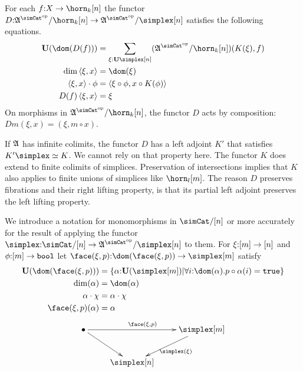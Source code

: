 \documentclass[csh.tex]{subfiles}
\begin{document}
\begin{definition}
For each $f\of X\to\horn_k[n]$ the functor $D\of \ambient\s/\horn_k[n]\to\ambient\s/\simplex[n]$ satisfies the following equations.
\begin{align*}
\base(\dom(D(f))) &= \sum_{\xi\of\base\simplex[n]}(\ambient\s/\horn_k[n])(K(\xi),f)\\
\dim\tuplet{\xi,x} &= \dom(\xi)\\
\tuplet{\xi,x}\cdot\phi &= \tuplet{\xi\circ\phi,x\circ K(\phi)}\\
D(f)\tuplet{\xi,x} &= \xi
\end{align*}
On morphisms in $\ambient\s/\horn_k[n]$, the functor $D$ acts by composition: $Dm(\xi,x) = (\xi,m\circ x)$. \label{descent functor}
\end{definition}

If $\mathfrak A$ has infinite colimits, the functor $D$ has a left adjoint $K'$ that satisfies $K'\simplex\simeq K$. We cannot rely on that property here. The functor $K$ does extend to finite colimits of simplices. Preservation of intersections implies that $K$ also applies to finite unions of simplices like $\horn_l[m]$. The reason $D$ preserves fibrations and their right lifting property, is that its partial left adjoint preserves the left lifting property. 

\begin{definition} We introduce a notation for monomorphisms in $\simCat/[n]$ or more accurately for the result of applying the functor $\simplex\of \simCat/[n] \to \ambient\s/\simplex[n]$ to them. For $\xi\mathord :[m]\to[n]$ and $\phi\mathord :[m]\to\mathtt{bool}$ let $\face(\xi,p)\of \dom(\face(\xi,p))\to \simplex[m]$ satisfy
\begin{align*}
\base(\dom(\face(\xi,p))) &= \set{\alpha\of\base(\simplex[m])\middle|\forall i\of \dom(\alpha).p\circ\alpha(i)=\true}\\
\dim(\alpha) &= \dom(\alpha)\\
\alpha\cdot\chi &= \alpha\cdot\chi\\
\face(\xi,p)(\alpha) &= \alpha
\end{align*}
\[\xymatrix{
\bullet\ar[rr]^{\face(\xi,p)}\ar[dr] && \simplex[m]\ar[dl]^{\simplex(\xi)} \\
& \simplex[n]
}\]
\end{definition}
\end{document}
